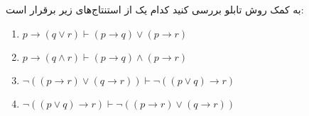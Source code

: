 به کمک روش تابلو بررسی کنید کدام یک از استنتاج‌های زیر برقرار است:
\begin{enumerate}[label=(\alph*)]
  \item $p \rightarrow (q \vee r) \vdash (p \rightarrow q) \vee (p \rightarrow r)$
  \item $p \rightarrow (q \wedge r) \vdash (p \rightarrow q) \wedge (p \rightarrow r)$
  \item $\neg ((p \rightarrow r) \vee (q \rightarrow r)) \vdash \neg ((p \vee q) \rightarrow r)$
  \item $\neg ((p \vee q) \rightarrow r) \vdash \neg ((p \rightarrow r) \vee (q \rightarrow r))$
\end{enumerate}